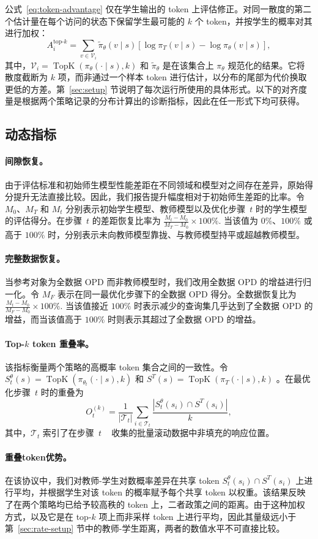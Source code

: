 公式~\ref{eq:token-advantage} 仅在学生输出的 token 上评估修正。对同一散度的第二个估计量在每个访问的状态下保留学生最可能的 $k$ 个 token，并按学生的概率对其进行加权：
\begin{equation}
    A_i^{\text{top-}k}
    =
    \sum_{v \in \mathcal{V}_i}
    \tilde{\pi}_\theta(v \mid s)
    \left[
        \log \pi_T(v \mid s) - \log \pi_\theta(v \mid s)
    \right],
    \label{eq:topk-advantage}
\end{equation}
其中，$\mathcal{V}_i = \operatorname{TopK}(\pi_\theta(\cdot \mid s), k)$ 和 $\tilde{\pi}_\theta$ 是在该集合上 $\pi_\theta$ 规范化的结果。它将散度截断为 $k$ 项，而非通过一个样本 token 进行估计，以分布的尾部为代价换取更低的方差。第~\ref{sec:setup} 节说明了每次运行所使用的具体形式。以下的对齐度量是根据两个策略记录的分布计算出的诊断指标，因此在任一形式下均可获得。



\subsection{动态指标}

\paragraph{间隙恢复。}
由于评估标准和初始师生模型性能差距在不同领域和模型对之间存在差异，原始得分提升无法直接比较。因此，我们报告提升幅度相对于初始师生差距的比率。令 $M_0$、$M_T$ 和 $M_t$ 分别表示初始学生模型、教师模型以及优化步骤~$t$ 时的学生模型的评估得分。在步骤~$t$ 的差距恢复比率为
$\frac{M_t-M_0}{M_T-M_0}\times100\%.$ 
当该值为 $0\%$、$100\%$ 或高于 $100\%$ 时，分别表示未向教师模型靠拢、与教师模型持平或超越教师模型。

\paragraph{完整数据恢复。}
当参考对象为全数据 OPD 而非教师模型时，我们改用全数据 OPD 的增益进行归一化。令 $M_F$ 表示在同一最优化步骤下的全数据 OPD 得分。全数据恢复比为
$\frac{M_t-M_0}{M_F-M_0}\times100\%.$  当该值接近 $100\%$ 时表示减少的查询集几乎达到了全数据 OPD 的增益，而当该值高于 $100\%$ 时则表示其超过了全数据 OPD 的增益。


\paragraph{Top-$k$  token 重叠率。}
该指标衡量两个策略的高概率 token 集合之间的一致性。令 $S_t^\theta(s)=\operatorname{TopK}(\pi_{\theta_t}(\cdot\mid s),k)$  和 $S^T(s)=\operatorname{TopK}(\pi_T(\cdot\mid s),k)$ 。在最优化步骤~$t$ 时的重叠为
\begin{equation}
    O_t^{(k)}
    =
    \frac{1}{|\mathcal{T}_t|}
    \sum_{i\in\mathcal{T}_t}
    \frac{|S_t^\theta(s_i)\cap S^T(s_i)|}{k},
    \label{eq:topk-overlap}
\end{equation}
其中，$\mathcal{T}_t$ 索引了在步骤~$t$ ~\citep{li2026rethinking} 收集的批量滚动数据中非填充的响应位置。

\paragraph{重叠token优势。}
在该协议中，我们对教师-学生对数概率差异在共享 token $S_t^\theta(s_i)\cap S^T(s_i)$ 上进行平均，并根据学生对该 token 的概率赋予每个共享 token 以权重。该结果反映了在两个策略均已给予较高秩的 token 上，二者政策之间的距离。由于这种加权方式，以及它是在 top-$k$ 项上而非采样 token 上进行平均，因此其量级远小于第~\ref{sec:rate-setup} 节中的教师-学生距离，两者的数值水平不可直接比较。
